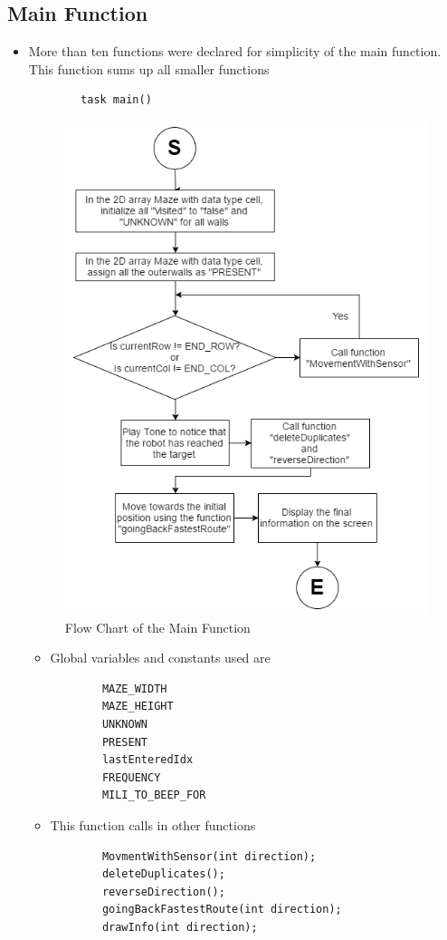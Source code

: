 \documentclass[11pt]{article}
\begin{document}

\subsection{Main Function}
\begin{itemize}
\item More than ten functions were declared for simplicity of the main function. This function sums up all smaller functions
	\begin{verbatim}
		task main()
	\end{verbatim}
\begin{figure}[htp]
\centering
\includegraphics[scale=0.51]{images/Software_Flowchart/task_main.png}
\caption{Flow Chart of the Main Function}
\label{}
\end{figure} 
	\begin{itemize}
	\item Global variables and constants used are
	\begin{verbatim}
		MAZE_WIDTH
		MAZE_HEIGHT
		UNKNOWN
		PRESENT
		lastEnteredIdx
		FREQUENCY
		MILI_TO_BEEP_FOR
	\end{verbatim}
	\item This function calls in other functions
	\begin{verbatim}
		MovmentWithSensor(int direction);
		deleteDuplicates();
		reverseDirection();
		goingBackFastestRoute(int direction);
		drawInfo(int direction);
	\end{verbatim}
	\end{itemize}
 

\end{itemize}
\end{document}
